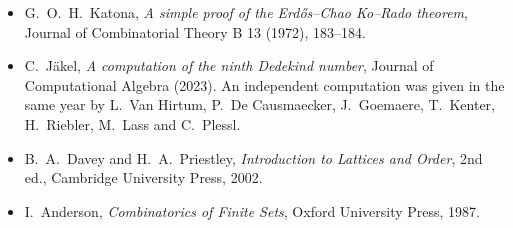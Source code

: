 \begin{itemize}
\item G.~O.~H.~Katona, \emph{A simple proof of the Erd\H os--Chao Ko--Rado theorem}, Journal of Combinatorial Theory B 13 (1972), 183--184.
\item C.~J\"akel, \emph{A computation of the ninth Dedekind number}, Journal of Computational Algebra (2023). An independent computation was given in the same year by L.~Van Hirtum, P.~De Causmaecker, J.~Goemaere, T.~Kenter, H.~Riebler, M.~Lass and C.~Plessl.
\item B.~A.~Davey and H.~A.~Priestley, \emph{Introduction to Lattices and Order}, 2nd ed., Cambridge University Press, 2002.
\item I.~Anderson, \emph{Combinatorics of Finite Sets}, Oxford University Press, 1987.
\end{itemize}
